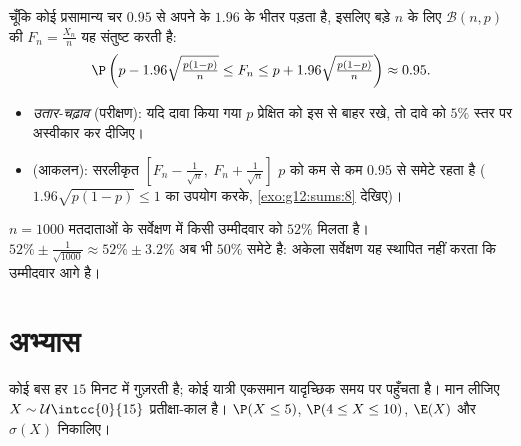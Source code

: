 \begin{method}[$95\%$ पर उतार-चढ़ाव अंतराल]\label{met:g12:contdist:fluctuation}
चूँकि कोई प्रसामान्य चर  $0.95$ से अपने  के $1.96$  के
भीतर पड़ता है, इसलिए बड़े $n$ के लिए $\mathcal B(n,p)$  की 
$F_n = \frac{X_n}{n}$ यह संतुष्ट करती है:
\[
\P\left(p - 1.96\sqrt{\tfrac{p(1-p)}{n}} \leq F_n \leq
p + 1.96\sqrt{\tfrac{p(1-p)}{n}}\right) \approx 0.95 .
\]
\begin{itemize}
  \item \emph{उतार-चढ़ाव } (परीक्षण): यदि दावा किया गया $p$ प्रेक्षित
         को इस  से बाहर रखे, तो दावे को $5\%$ स्तर पर
        अस्वीकार कर दीजिए।
  \item \emph{} (आकलन): सरलीकृत 
        $\left[F_n - \frac{1}{\sqrt n},\ F_n + \frac{1}{\sqrt n}\right]$
        $p$ को कम से कम $0.95$  से समेटे रहता है ($1.96\sqrt{p(1-p)} \leq 1$ का उपयोग
        करके, \cref{exo:g12:sums:8} देखिए)।
\end{itemize}
\end{method}

\begin{example}\label{ex:g12:contdist:poll}
$n = 1000$ मतदाताओं के सर्वेक्षण में किसी उम्मीदवार को $52\%$ मिलता है।  $52\% \pm \frac{1}{\sqrt{1000}} \approx 52\% \pm 3.2\%$ अब भी $50\%$ समेटे है: अकेला सर्वेक्षण यह स्थापित नहीं करता कि
उम्मीदवार आगे है।
\end{example}

\section{अभ्यास}

\begin{exercise}[$\star$]\label{exo:g12:contdist:1}
कोई बस हर $15$ मिनट में गुज़रती है; कोई यात्री एकसमान यादृच्छिक समय पर
पहुँचता है। मान लीजिए $X \sim \mathcal U\intcc{0}{15}$ प्रतीक्षा-काल है। $\P(X \leq 5)$, $\P(4 \leq X \leq 10)$, $\E(X)$ और $\sigma(X)$
निकालिए।
\end{exercise}

